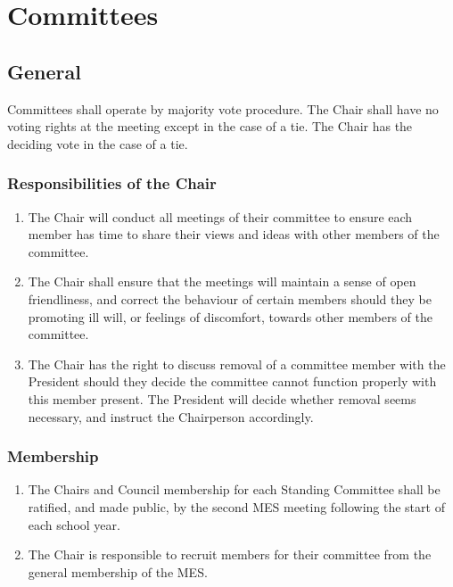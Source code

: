 \section{Committees}
\label{committees}

\subsection{General}
\label{committees-general}
Committees shall operate by majority vote procedure. The Chair shall
have no voting rights at the meeting except in the case of a tie. The
Chair has the deciding vote in the case of a tie.

\subsubsection{Responsibilities of the Chair}
\label{responsibilities-of-the-chair}

\begin{enumerate}
 \item
  The Chair will conduct all meetings of their committee to ensure each member has time to share their views and ideas with other members of the committee.
 \item
  The Chair shall ensure that the meetings will maintain a sense of open friendliness, and correct the behaviour of certain members should they be promoting ill will, or feelings of discomfort, towards other members of the committee.
 \item
  The Chair has the right to discuss removal of a committee member with the President should they decide the committee cannot function properly with this member present. The President will decide whether removal seems necessary, and instruct the Chairperson accordingly.
\end{enumerate}

\subsubsection{Membership}
\label{membership}
\begin{enumerate}
 \item
  The Chairs and Council membership for each Standing Committee shall be ratified, and made public, by the second MES meeting following the start of each school year.
 \item
  The Chair is responsible to recruit members for their committee from the general membership of the MES.

\end{enumerate}

